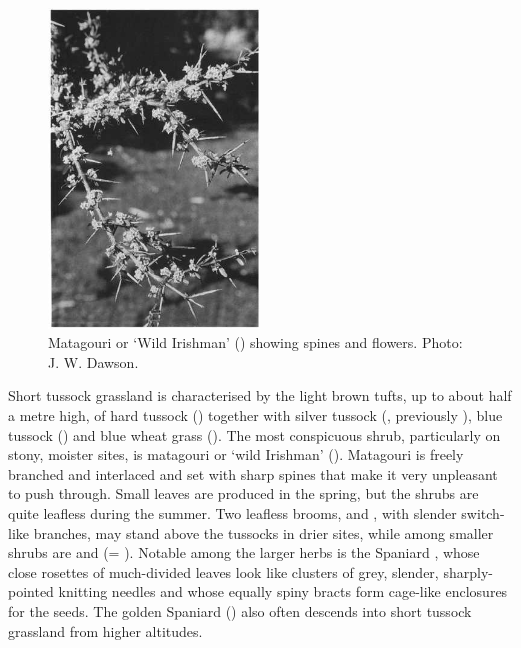 \begin{figure}
	\includegraphics[width=0.5\textwidth]{graphics/figure83matagouri.jpg}
	\centering
	\caption[Matagouri]{Matagouri or `Wild Irishman' () showing spines and flowers.
	Photo:  J. W. Dawson.}%
	\label{fig:83matagouri}
\end{figure}

Short tussock grassland is characterised by the light brown tufts, up to about half a metre high, of hard tussock () together with silver tussock (, previously ), blue tussock () and blue wheat grass ().
The most conspicuous shrub, particularly on stony, moister sites, is matagouri or `wild Irishman' ().
Matagouri is freely branched and interlaced and set with sharp spines that make it very unpleasant to push through.
Small leaves are produced in the spring, but the shrubs are quite leafless during the summer.
Two leafless brooms,  and , with slender switch-like branches, may stand above the tussocks in drier sites, while among smaller shrubs are  and  (= ).
Notable among the larger herbs is the Spaniard , whose close rosettes of much-divided leaves look like clusters of grey, slender, sharply-pointed knitting needles and whose equally spiny bracts form cage-like enclosures for the seeds.
The golden Spaniard () also often descends into short tussock grassland from higher altitudes.

